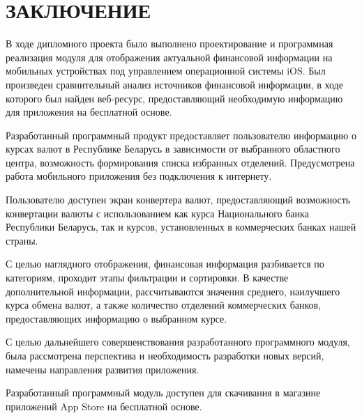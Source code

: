 \section*{ЗАКЛЮЧЕНИЕ}

В ходе дипломного проекта было выполнено проектирование и программная реализация
модуля для отображения актуальной финансовой информации на мобильных устройствах
под управлением операционной системы iOS. Был произведен сравнительный
анализ источников финансовой информации, в ходе которого был найден
веб-ресурс, предоставляющий необходимую информацию для приложения на
бесплатной основе.

Разработанный программный продукт предоставляет пользователю информацию о курсах
валют в Республике Беларусь в зависимости от выбранного областного центра,
возможность формирования списка избранных отделений.
Предусмотрена работа мобильного приложения без подключения к интернету.

Пользователю доступен экран конвертера валют, предоставляющий возможность
конвертации валюты с использованием как курса Национального банка Республики
Беларусь, так и курсов, установленных в коммерческих банках нашей страны.

С целью наглядного отображения, финансовая информация разбивается
по категориям, проходит этапы фильтрации и сортировки. В качестве дополнительной
информации, рассчитываются значения среднего, наилучшего курса обмена валют,
а также количество отделений коммерческих банков, предоставляющих информацию о
выбранном курсе.

С целью дальнейшего совершенствования разработанного программного модуля,
была рассмотрена перспектива и необходимость разработки новых версий,
намечены направления развития приложения.

Разработанный программный модуль доступен для скачивания в магазине приложений
App Store на бесплатной основе.
